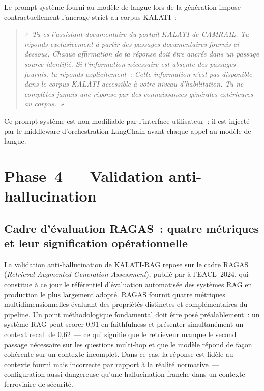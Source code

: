 \documentclass[12pt,a4paper]{report}
\begin{document}
Le prompt système fourni au modèle de langue lors de la génération impose contractuellement
l'ancrage strict au corpus KALATI~:

\begin{quote}
\itshape
«~Tu es l'assistant documentaire du portail KALATI de CAMRAIL. Tu réponds exclusivement à
partir des passages documentaires fournis ci-dessous. Chaque affirmation de ta réponse doit
être ancrée dans un passage source identifié. Si l'information nécessaire est absente des
passages fournis, tu réponds explicitement~: \emph{Cette information n'est pas disponible dans
le corpus KALATI accessible à votre niveau d'habilitation.} Tu ne complètes jamais une réponse
par des connaissances générales extérieures au corpus.~»
\end{quote}

Ce prompt système est non modifiable par l'interface utilisateur~: il est injecté par le
middleware d'orchestration LangChain avant chaque appel au modèle de langue.

\section{Phase~4 --- Validation anti-hallucination}
\label{sec:validation}

\subsection{Cadre d'évaluation RAGAS~: quatre métriques et leur signification opérationnelle}

La validation anti-hallucination de KALATI-RAG repose sur le cadre RAGAS
(\textit{Retrieval-Augmented Generation Assessment}), publié par \textcite{Es2024} à l'EACL~2024,
qui constitue à ce jour le référentiel d'évaluation automatisée des systèmes RAG en production
le plus largement adopté. RAGAS fournit quatre métriques multidimensionnelles évaluant des
propriétés distinctes et complémentaires du pipeline. Un point méthodologique fondamental doit
être posé préalablement~: un système RAG peut scorer 0,91 en faithfulness et présenter
simultanément un context recall de 0,62~--- ce qui signifie que le retrieveur manque le second
passage nécessaire sur les questions multi-hop et que le modèle répond de façon cohérente sur
un contexte incomplet. Dans ce cas, la réponse est fidèle au contexte fourni mais incorrecte
par rapport à la réalité normative~--- configuration aussi dangereuse qu'une hallucination
franche dans un contexte ferroviaire de sécurité.
\end{document}
